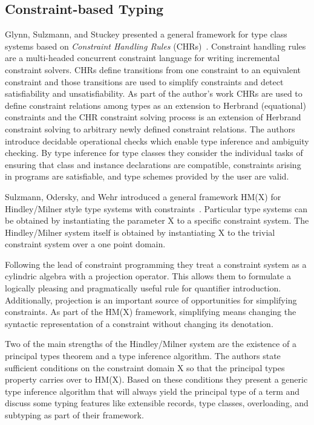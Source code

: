 \subsection{Constraint-based Typing}

Glynn, Sulzmann, and Stuckey presented a general framework for type
class systems based on \textit{Constraint Handling Rules}
(CHRs)~\cite{Glynn2001}. Constraint handling rules are a multi-headed
concurrent constraint language for writing incremental constraint
solvers. CHRs define transitions from one constraint to an equivalent
constraint and those transitions are used to simplify constraints and
detect satisfiability and unsatisfiability. As part of the author's
work CHRs are used to define constraint relations among types as an
extension to Herbrand (equational) constraints and the CHR constraint
solving process is an extension of Herbrand constraint solving to
arbitrary newly defined constraint relations. The authors introduce
decidable operational checks which enable type inference and ambiguity
checking. By type inference for type classes they consider the
individual tasks of ensuring that class and instance declarations are
compatible, constraints arising in programs are satisfiable, and type
schemes provided by the user are valid.

\bigskip 
Sulzmann, Odersky, and Wehr introduced a general framework HM(X) for
Hindley/Milner style type systems with
constraints~\cite{Odersky1999,Sulzmann2000}. Particular type systems
can be obtained by instantiating the parameter X to a specific
constraint system. The Hindley/Milner system itself is obtained by
instantiating X to the trivial constraint system over a one point
domain.

Following the lead of constraint programming they treat a constraint
system as a cylindric algebra with a projection operator. This allows
them to formulate a logically pleasing and pragmatically useful rule
for quantifier introduction. Additionally, projection is an important
source of opportunities for simplifying constraints. As part of the
HM(X) framework, simplifying means changing the syntactic
representation of a constraint without changing its denotation.

Two of the main strengths of the Hindley/Milner system are the
existence of a principal types theorem and a type inference
algorithm. The authors state sufficient conditions on the constraint
domain X so that the principal types property carries over to
HM(X). Based on these conditions they present a generic type inference
algorithm that will always yield the principal type of a term and
discuss some typing features like extensible records, type classes,
overloading, and subtyping as part of their framework.

